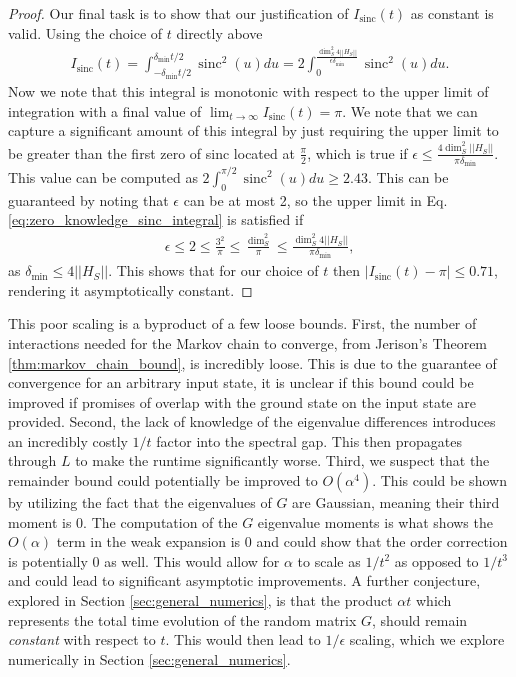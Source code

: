 \documentclass{article}
\newcommand{\norm}[1]{\left|\left| #1 \right|\right|}
\newcommand{\bigo}[1]{O\left(#1\right)}
\DeclareMathOperator{\sinc}{sinc}
\begin{document}
\begin{proof}
    Our final task is to show that our justification of $I_{\sinc}(t)$ as constant is valid. Using the choice of $t$ directly above
    \begin{align}
        I_{\sinc}(t) = \int_{-\delta_{\min} t /2}^{\delta_{\min} t /2}  \sinc^2(u) du = 2 \int_{0}^{ \frac{\dim_S^2 4 \norm{H_S}} {\epsilon \delta_{\min}}} \sinc^2(u) du. \label{eq:zero_knowledge_sinc_integral}
    \end{align}
    Now we note that this integral is monotonic with respect to the upper limit of integration with a final value of $\lim_{t \to \infty} I_{\sinc}(t) = \pi$. We note that we can capture a significant amount of this integral by just requiring the upper limit to be greater than the first zero of sinc located at $\frac{\pi}{2}$, which is true if $\epsilon \le \frac{4 \dim_S^2 \norm{H_S}}{\pi \delta_{\min}}$. This value can be computed as $2 \int_0^{\pi / 2} \sinc^2(u) du \ge 2.43$. This can be guaranteed by noting that $\epsilon$ can be at most 2, so the upper limit in Eq. \eqref{eq:zero_knowledge_sinc_integral} is satisfied if
    \begin{align}
    \epsilon \le 2 \le \frac{3^2}{\pi} \le \frac{\dim_S^2}{\pi} \le \frac{\dim_S^2 4 \norm{H_S}}{\pi \delta_{\min}},
\end{align}
as $\delta_{\min} \le 4 \norm{H_S}$. This shows that for our choice of $t$ then $|I_{\sinc}(t) - \pi| \le 0.71$, rendering it asymptotically constant.
\end{proof}



This poor scaling is a byproduct of a few loose bounds. First, the number of interactions needed for the Markov chain to converge, from Jerison's Theorem \ref{thm:markov_chain_bound}, is incredibly loose. This is due to the guarantee of convergence for an arbitrary input state, it is unclear if this bound could be improved if promises of overlap with the ground state on the input state are provided. Second, the lack of knowledge of the eigenvalue differences introduces an incredibly costly $1 / t$ factor into the spectral gap. This then propagates through $L$ to make the runtime significantly worse. Third, we suspect that the remainder bound could potentially be improved to $\bigo{\alpha^4}$. This could be shown by utilizing the fact that the eigenvalues of $G$ are Gaussian, meaning their third moment is 0. The computation of the $G$ eigenvalue moments is what shows the $\bigo{\alpha}$ term in the weak expansion is 0 and could show that the order correction is potentially 0 as well. This would allow for $\alpha$ to scale as $1 / t^2$ as opposed to $1 / t^3$ and could lead to significant asymptotic improvements. A further conjecture, explored in Section \ref{sec:general_numerics}, is that the product $\alpha t$ which represents the total time evolution of the random matrix $G$, should remain \emph{constant} with respect to $t$. This would then lead to $1/\epsilon$ scaling, which we explore numerically in Section \ref{sec:general_numerics}.
\end{document}

